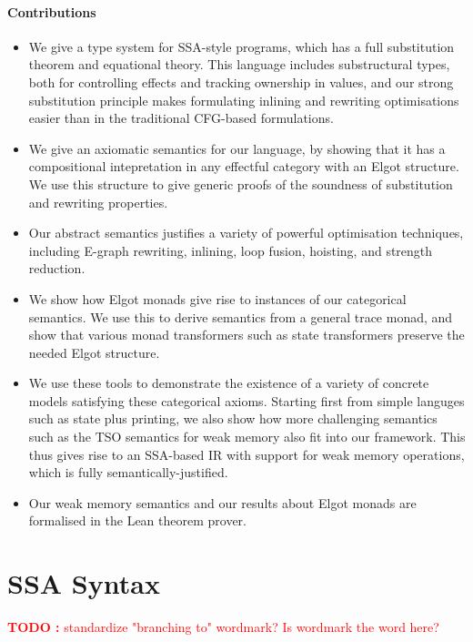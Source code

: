 \documentclass[acmsmall,screen,review]{acmart}
\newcounter{todos}
\newcommand{\TODO}[1]{{
  \stepcounter{todos}
  \begin{center}\large{\textcolor{red}{\textbf{TODO \arabic{todos}:} #1}}\end{center}
}}
\begin{document}
\paragraph{Contributions} 

\begin{itemize}
\item We give a type system for SSA-style programs, which has a full
substitution theorem and equational theory. This language includes substructural
types, both for controlling effects and tracking ownership in values, and our
strong substitution principle makes formulating inlining and rewriting
optimisations easier than in the traditional CFG-based formulations. 
\item We give an axiomatic semantics for our language, by showing that it has a
compositional intepretation in any effectful category with an Elgot structure.
We use this structure to give generic proofs of the soundness of substitution
and rewriting properties.
\item Our abstract semantics justifies a variety of powerful optimisation
techniques, including E-graph rewriting, inlining, loop fusion, hoisting, and
strength reduction. 
\item We show how Elgot monads give rise to instances of our categorical
semantics. We use this to derive semantics from a general trace monad, and show
that various monad transformers such as state transformers preserve the needed
Elgot structure. 
\item We use these tools to demonstrate the existence of a variety of concrete
models satisfying these categorical axioms. Starting first from simple languges
such as state plus printing, we also show how more challenging semantics such as
the TSO semantics for weak memory also fit into our framework. This thus gives
rise to an SSA-based IR with support for weak memory operations, which is fully
semantically-justified.
\item Our weak memory semantics and our results about Elgot monads are
formalised in the Lean theorem prover.
\end{itemize}

\section{SSA Syntax}

\TODO{standardize "branching to" wordmark? Is wordmark the word here?}
\end{document}
